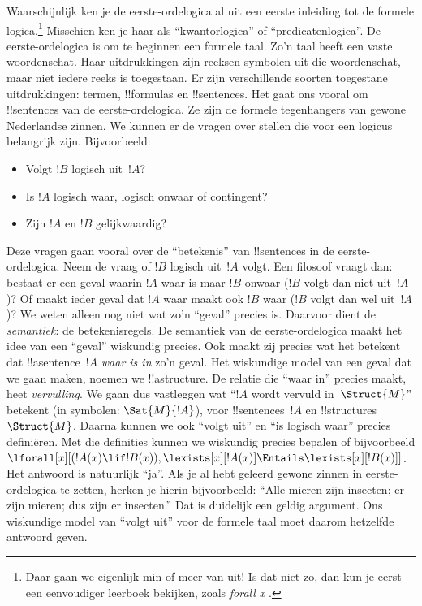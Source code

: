 \documentclass[openany]{memoir}
\begin{document}


Waarschijnlijk ken je de eerste-ordelogica al uit een eerste inleiding
tot de formele logica.\footnote{Daar gaan we eigenlijk min of meer van
uit!{} Is dat niet zo, dan kun je eerst een eenvoudiger leerboek
bekijken, zoals \emph{forall x} \citep{Magnus2021}.} Misschien ken je
haar als ``kwantorlogica'' of ``predicatenlogica''. De eerste-ordelogica
is om te beginnen een formele taal. Zo'n taal heeft een vaste
woordenschat. Haar uitdrukkingen zijn reeksen symbolen uit die
woordenschat, maar niet iedere reeks is toegestaan. Er zijn verschillende
soorten toegestane uitdrukkingen: termen, !!{formula}s en !!{sentence}s.
Het gaat ons vooral om !!{sentence}s van de eerste-ordelogica. Ze zijn de
formele tegenhangers van gewone Nederlandse zinnen. We kunnen er de
vragen over stellen die voor een logicus belangrijk zijn. Bijvoorbeeld:
\begin{itemize}
    \item Volgt $!B$ logisch uit~$!A$?
    \item Is $!A$ logisch waar, logisch onwaar of
contingent?
    \item Zijn $!A$ en $!B$ gelijkwaardig?
\end{itemize}

Deze vragen gaan vooral over de ``betekenis'' van !!{sentence}s in de
eerste-ordelogica. Neem de vraag of $!B$ logisch uit~$!A$ volgt. Een
filosoof vraagt dan: bestaat er een geval waarin $!A$ waar is maar $!B$
onwaar ($!B$ volgt dan niet uit~$!A$)? Of maakt ieder geval dat $!A$ waar
maakt ook $!B$ waar ($!B$ volgt dan wel uit~$!A$)? We weten alleen nog
niet wat zo'n ``geval'' precies is. Daarvoor dient de \emph{semantiek}:
de betekenisregels. De semantiek van de eerste-ordelogica maakt het idee
van een ``geval'' wiskundig precies. Ook maakt zij precies wat het
betekent dat !!a{sentence}~$!A$ \emph{waar is in} zo'n geval. Het
wiskundige model van een geval dat we gaan maken, noemen we
!!a{structure}. De relatie die ``waar in'' precies maakt, heet
\emph{vervulling}. We gaan dus vastleggen wat ``$!A$ wordt vervuld
in~$\Struct{M}$'' betekent (in symbolen: $\Sat{M}{!A}$), voor
!!{sentence}s~$!A$ en !!{structure}s~$\Struct{M}$. Daarna kunnen we ook
``volgt uit'' en ``is logisch waar'' precies definiëren. Met die
definities kunnen we
wiskundig precies bepalen of bijvoorbeeld
$\lforall[x][(!A(x) \lif !B(x)),
\lexists[x][!A(x)] \Entails \lexists[x][!B(x)]]$. Het antwoord is
natuurlijk ``ja''. Als je al hebt geleerd gewone zinnen in
eerste-ordelogica te zetten, herken je hierin bijvoorbeeld: ``Alle
mieren zijn insecten; er zijn mieren; dus zijn er insecten.'' Dat is
duidelijk een geldig argument. Ons wiskundige model van ``volgt uit''
voor de formele taal moet daarom hetzelfde antwoord geven.
\end{document}
